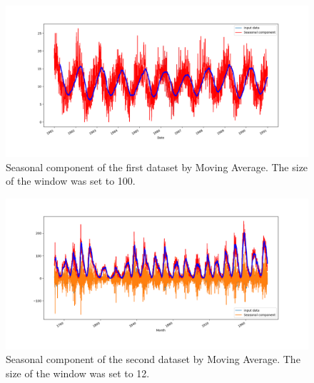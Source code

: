 \begin{figure}[H]
    \centering
    \begin{minipage}[b]{1\textwidth}
        \includegraphics[width=\textwidth]{figures/Ass1/Ass1_D1_Moving_Avrage.png}
    \end{minipage}
    \caption{Seasonal component of the first dataset by Moving Average. The size of the window was set to 100.}
    \label{fig:Ass1_D1_Moving_Avrage}
\end{figure}

\begin{figure}[H]
    \centering
    \begin{minipage}[b]{1\textwidth}
        \includegraphics[width=\textwidth]{figures/Ass1/Ass1_D2_Moving_Avrage.png}
    \end{minipage}
    \caption{Seasonal component of the second dataset by Moving Average. The size of the window was set to 12.  }
    \label{fig:Ass1_D2_Moving_Avrage}
\end{figure}



